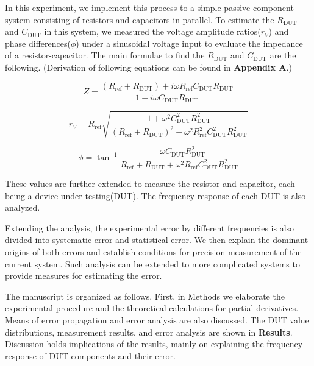 \documentclass[%
 aip,
 amsmath,amssymb,
 reprint,%
]{revtex4-1}
\begin{document}
In this experiment, we implement this process to a simple passive component system consisting of resistors and capacitors in parallel. To estimate the $R_{\textrm{DUT}}$ and $C_{\textrm{DUT}}$ in this system, we measured the voltage amplitude ratios($r_V$) and phase differences($\phi$) under a sinusoidal voltage input to evaluate the impedance of a resistor-capacitor. The main formulae to find the $R_{\textrm{DUT}}$ and $C_{\textrm{DUT}}$ are the following. (Derivation of following equations can be found in \textbf{\textsf{Appendix A}}.)

\begin{equation}
Z=\frac{(R_{\textrm{ref}}+R_{\textrm{DUT}})+i\omega R_{\textrm{ref}} C_{\textrm{DUT}}R_{\textrm{DUT}}}{1+i\omega C_{\textrm{DUT}}R_{\textrm{DUT}}}
\end{equation}

\begin{equation}
r_{V}=R_{\textrm{ref}}\sqrt{\frac{1+\omega^{2}C_{\textrm{DUT}}^{2}R_{\textrm{DUT}}^{2}}{(R_{\textrm{ref}}+R_{\textrm{DUT}})^{2}+\omega^{2}R_{\textrm{ref}}^{2}C_{\textrm{DUT}}^{2}R_{\textrm{DUT}}^{2}}}
\end{equation}

\begin{equation}
\phi=\tan^{-1}\frac{-\omega C_{\textrm{DUT}}R_{\textrm{DUT}}^{2}}{R_{\textrm{ref}}+R_{\textrm{DUT}}+\omega^{2} R_{\textrm{ref}}C_{\textrm{DUT}}^{2}R_{\textrm{DUT}}^{2}}
\end{equation}

\noindent These values are further extended to measure the resistor and capacitor, each being a device under testing(DUT). The frequency response of each DUT is also analyzed.

Extending the analysis, the experimental error by different frequencies is also divided into systematic error and statistical error. We then explain the dominant origins of both errors and establish conditions for precision measurement of the current system. Such analysis can be extended to more complicated systems to provide measures for estimating the error. 

The manuscript is organized as follows. First, in Methods we elaborate the experimental procedure and the theoretical calculations for partial derivatives. Means of error propagation and error analysis are also discussed. The DUT value distributions, measurement results, and error analysis are shown in \textbf{\textsf{Results}}. Discussion holds implications of the results, mainly on explaining the frequency response of DUT components and their error. 
\end{document}
